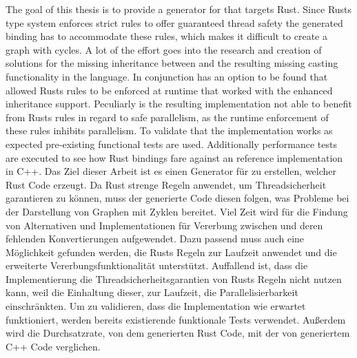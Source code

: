 \documentclass[thesis]{subfiles}
\begin{document}
{
\let\cleardoublepage\relax
{}
The goal of this thesis is to provide a generator for  that targets Rust.
Since Rusts type system enforces strict rules to offer guaranteed thread safety the generated binding has to accommodate these rules, which makes it difficult to create a graph with cycles.
A lot of the effort goes into the research and creation of solutions for the missing inheritance between \structs and the resulting missing casting functionality in the language.
In conjunction has an option to be found that allowed Rusts rules to be enforced at runtime that worked with the enhanced inheritance support.
Peculiarly is the resulting implementation not able to benefit from Rusts rules in regard to safe parallelism, as the runtime enforcement of these rules inhibits parallelism.
To validate that the implementation works as expected pre-existing functional tests are used.
Additionally performance tests are executed to see how Rust bindings fare against an reference implementation in C++.
}
Das Ziel dieser Arbeit ist es einen Generator für  zu erstellen, welcher Rust Code erzeugt.
Da Rust strenge Regeln anwendet, um Threadsicherheit garantieren zu können, muss der generierte Code diesen folgen, was Probleme bei der Darstellung von Graphen mit Zyklen bereitet.
Viel Zeit wird für die Findung von Alternativen und Implementationen für Vererbung zwischen \structs und deren fehlenden Konvertierungen aufgewendet.
Dazu passend muss auch eine Möglichkeit gefunden werden, die Rusts Regeln zur Laufzeit anwendet und die erweiterte Vererbungsfunktionalität unterstützt.
Auffallend ist, dass die Implementierung die Threadsicherheitsgarantien von Rusts Regeln  nicht nutzen kann, weil die Einhaltung dieser, zur Laufzeit, die Parallelisierbarkeit einschränkten.
Um zu validieren, dass die Implementation wie erwartet funktioniert, werden bereits existierende funktionale Tests verwendet.
Außerdem wird die Durchsatzrate, von dem generierten Rust Code, mit der von generiertem C++ Code verglichen.
\end{document}
